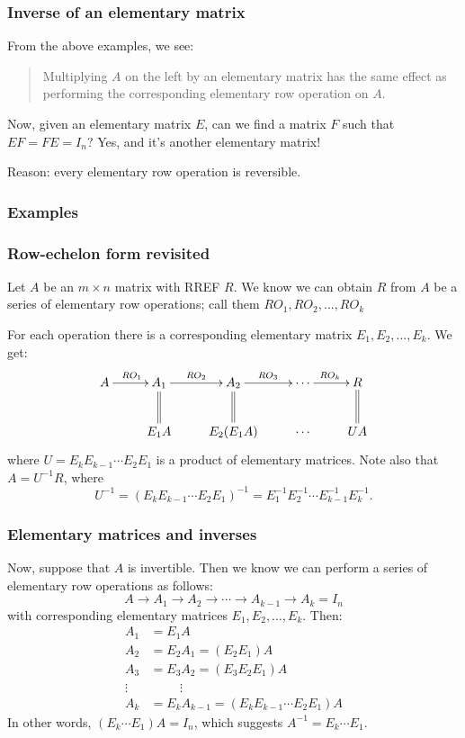 \documentclass[11pt,t]{beamer}
\begin{document}
\begin{frame}
\frametitle{Inverse of an elementary matrix}
From the above examples, we see:
\begin{quote}
\alert{Multiplying $A$ on the left by an elementary matrix has the same effect as performing the corresponding elementary row operation on $A$.}
\end{quote}
Now, given an elementary matrix $E$, can we find a matrix $F$ such that $EF=FE=I_n$? Yes, and it's another elementary matrix!

\bigskip

Reason: every elementary row operation is \alert{reversible}.
\end{frame}
\begin{frame}
\frametitle{Examples}


\end{frame}
\begin{frame}
\frametitle{Row-echelon form revisited}
Let $A$ be an $m\times n$ matrix with RREF $R$. We know we can obtain $R$ from $A$ be a series of elementary row operations; call them $RO_1, RO_2, \ldots, RO_k$ 

For each operation there is a corresponding elementary matrix $E_1, E_2, \ldots, E_k$. We get:
 \[
 \xymatrix{
 A \ar[r]^{RO_1} & A_1 \ar[r]^{RO_2} \ar@{=}[d] & A_2 \ar[r]^{RO_3} \ar@{=}[d] & \cdots \ar[r]^{RO_k}  & R \ar@{=}[d]\\
 & E_1A & E_2(E_1A) & \cdots & UA
 }
 \]
 where $U=E_kE_{k-1}\cdots E_2E_1$ is a product of elementary matrices. Note also that $A=U^{-1}R$, where
 \[
 U^{-1} = (E_kE_{k-1}\cdots E_2E_1)^{-1} = E_1^{-1}E_2^{-1}\cdots E_{k-1}^{-1}E_k^{-1}.
 \]
\end{frame}
\begin{frame}
\frametitle{Elementary matrices and inverses}
Now, suppose that $A$ is invertible. Then we know we can perform a series of elementary row operations as follows:
\[
A \to A_1 \to A_2 \to \cdots \to A_{k-1} \to A_k=I_n
\]
with corresponding elementary matrices $E_1, E_2,\ldots, E_k$. Then:
\begin{align*}
A_1 & = E_1A\\
A_2 & = E_2A_1 = (E_2E_1)A\\
A_3 & = E_3A_2 = (E_3E_2E_1)A\\
 \vdots & \phantom{abcde} \vdots\\
A_k & = E_kA_{k-1} = (E_kE_{k-1}\cdots E_2E_1)A 
\end{align*}
In other words, $(E_k\cdots E_1)A = I_n$, which suggests $A^{-1} = E_k\cdots E_1$.
\end{frame}
\end{document}
